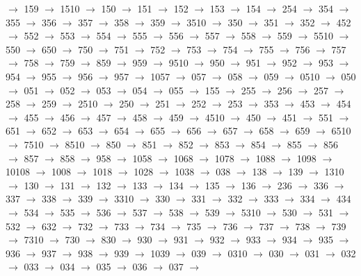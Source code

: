 $\rightarrow$ 159 $\rightarrow$ 1510 $\rightarrow$ 150 $\rightarrow$ 151 $\rightarrow$ 152 $\rightarrow$ 153 $\rightarrow$ 154 $\rightarrow$ 254 $\rightarrow$ 354 $\rightarrow$ 355 $\rightarrow$ 356 $\rightarrow$ 357 $\rightarrow$ 358 $\rightarrow$ 359 $\rightarrow$ 3510 $\rightarrow$ 350 $\rightarrow$ 351 $\rightarrow$ 352 $\rightarrow$ 452 $\rightarrow$ 552 $\rightarrow$ 553 $\rightarrow$ 554 $\rightarrow$ 555 $\rightarrow$ 556 $\rightarrow$ 557 $\rightarrow$ 558 $\rightarrow$ 559 $\rightarrow$ 5510 $\rightarrow$ 550 $\rightarrow$ 650 $\rightarrow$ 750 $\rightarrow$ 751 $\rightarrow$ 752 $\rightarrow$ 753 $\rightarrow$ 754 $\rightarrow$ 755 $\rightarrow$ 756 $\rightarrow$ 757 $\rightarrow$ 758 $\rightarrow$ 759 $\rightarrow$ 859 $\rightarrow$ 959 $\rightarrow$ 9510 $\rightarrow$ 950 $\rightarrow$ 951 $\rightarrow$ 952 $\rightarrow$ 953 $\rightarrow$ 954 $\rightarrow$ 955 $\rightarrow$ 956 $\rightarrow$ 957 $\rightarrow$ 1057 $\rightarrow$ 057 $\rightarrow$ 058 $\rightarrow$ 059 $\rightarrow$ 0510 $\rightarrow$ 050 $\rightarrow$ 051 $\rightarrow$ 052 $\rightarrow$ 053 $\rightarrow$ 054 $\rightarrow$ 055 $\rightarrow$ 155 $\rightarrow$ 255 $\rightarrow$ 256 $\rightarrow$ 257 $\rightarrow$ 258 $\rightarrow$ 259 $\rightarrow$ 2510 $\rightarrow$ 250 $\rightarrow$ 251 $\rightarrow$ 252 $\rightarrow$ 253 $\rightarrow$ 353 $\rightarrow$ 453 $\rightarrow$ 454 $\rightarrow$ 455 $\rightarrow$ 456 $\rightarrow$ 457 $\rightarrow$ 458 $\rightarrow$ 459 $\rightarrow$ 4510 $\rightarrow$ 450 $\rightarrow$ 451 $\rightarrow$ 551 $\rightarrow$ 651 $\rightarrow$ 652 $\rightarrow$ 653 $\rightarrow$ 654 $\rightarrow$ 655 $\rightarrow$ 656 $\rightarrow$ 657 $\rightarrow$ 658 $\rightarrow$ 659 $\rightarrow$ 6510 $\rightarrow$ 7510 $\rightarrow$ 8510 $\rightarrow$ 850 $\rightarrow$ 851 $\rightarrow$ 852 $\rightarrow$ 853 $\rightarrow$ 854 $\rightarrow$ 855 $\rightarrow$ 856 $\rightarrow$ 857 $\rightarrow$ 858 $\rightarrow$ 958 $\rightarrow$ 1058 $\rightarrow$ 1068 $\rightarrow$ 1078 $\rightarrow$ 1088 $\rightarrow$ 1098 $\rightarrow$ 10108 $\rightarrow$ 1008 $\rightarrow$ 1018 $\rightarrow$ 1028 $\rightarrow$ 1038 $\rightarrow$ 038 $\rightarrow$ 138 $\rightarrow$ 139 $\rightarrow$ 1310 $\rightarrow$ 130 $\rightarrow$ 131 $\rightarrow$ 132 $\rightarrow$ 133 $\rightarrow$ 134 $\rightarrow$ 135 $\rightarrow$ 136 $\rightarrow$ 236 $\rightarrow$ 336 $\rightarrow$ 337 $\rightarrow$ 338 $\rightarrow$ 339 $\rightarrow$ 3310 $\rightarrow$ 330 $\rightarrow$ 331 $\rightarrow$ 332 $\rightarrow$ 333 $\rightarrow$ 334 $\rightarrow$ 434 $\rightarrow$ 534 $\rightarrow$ 535 $\rightarrow$ 536 $\rightarrow$ 537 $\rightarrow$ 538 $\rightarrow$ 539 $\rightarrow$ 5310 $\rightarrow$ 530 $\rightarrow$ 531 $\rightarrow$ 532 $\rightarrow$ 632 $\rightarrow$ 732 $\rightarrow$ 733 $\rightarrow$ 734 $\rightarrow$ 735 $\rightarrow$ 736 $\rightarrow$ 737 $\rightarrow$ 738 $\rightarrow$ 739 $\rightarrow$ 7310 $\rightarrow$ 730 $\rightarrow$ 830 $\rightarrow$ 930 $\rightarrow$ 931 $\rightarrow$ 932 $\rightarrow$ 933 $\rightarrow$ 934 $\rightarrow$ 935 $\rightarrow$ 936 $\rightarrow$ 937 $\rightarrow$ 938 $\rightarrow$ 939 $\rightarrow$ 1039 $\rightarrow$ 039 $\rightarrow$ 0310 $\rightarrow$ 030 $\rightarrow$ 031 $\rightarrow$ 032 $\rightarrow$ 033 $\rightarrow$ 034 $\rightarrow$ 035 $\rightarrow$ 036 $\rightarrow$ 037 $\rightarrow$ 